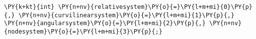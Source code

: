 \begin{Verbatim}[commandchars=\\\{\}]
    \PY{k+kt}{int} \PY{n+nv}{relativesystem}\PY{o}{=}\PY{l+m+mi}{0}\PY{p}{,} \PY{n+nv}{curvilinearsystem}\PY{o}{=}\PY{l+m+mi}{1}\PY{p}{,} \PY{n+nv}{angularsystem}\PY{o}{=}\PY{l+m+mi}{2}\PY{p}{,} \PY{n+nv}{nodesystem}\PY{o}{=}\PY{l+m+mi}{3}\PY{p}{;}
\end{Verbatim}
